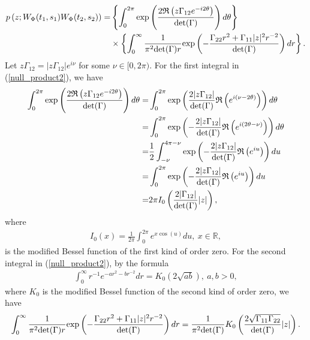 \documentclass{amsart}
\begin{document}
\begin{align}\label{null_product2}
p\left(z;W_{\Phi}(t_{1},s_{1})W_{\Phi}(t_{2},s_{2})\right)
=&
\left\{\int_{0}^{2\pi}
\textup{exp}
\left(
\frac{2\mathfrak{R}\left(z\Gamma_{12} e^{-i2\theta}
\right)}{\det(\Gamma)}\right)
d\theta\right\}
\\\notag&\times\left\{\int_{0}^{\infty}\frac{1}{\pi^{2}\textup{det}(\Gamma)r}
\textup{exp}\left(-
\frac{\Gamma_{22} r^{2}+\Gamma_{11}|z|^{2}r^{-2}}
{\det(\Gamma)}
\right)dr\right\}.
\end{align}
Let $z\Gamma_{12}= |z\Gamma_{12}|e^{i\nu}$ for some $\nu\in [0,2\pi)$.
For the first integral in (\ref{null_product2}), we have
\begin{align}\notag
\int_{0}^{2\pi}
\textup{exp}
\left(
\frac{2\mathfrak{R}\left(z\Gamma_{12}e^{-i2\theta}
\right)}{\det(\Gamma)}\right)
d\theta
=&\int_{0}^{2\pi}
\textup{exp}
\left(
\frac{2|z\Gamma_{12}|}{\det(\Gamma)}\mathfrak{R}\left(e^{i(\nu-2\theta)}
\right)\right)
d\theta
\\\notag=&
\int_{0}^{2\pi}
\textup{exp}
\left(
-\frac{2|z\Gamma_{12}|}{\det(\Gamma)}\mathfrak{R}\left(e^{i(2\theta-\nu)}
\right)\right)
d\theta
\\\notag=&\frac{1}{2}
\int_{-\nu}^{4\pi-\nu}
\textup{exp}
\left(
-\frac{2|z\Gamma_{12}|}{\det(\Gamma)}\mathfrak{R}\left(e^{iu}
\right)\right)
du
\\\notag=&\int_{0}^{2\pi}
\textup{exp}
\left(
-\frac{2|z\Gamma_{12}|}{\det(\Gamma)}\mathfrak{R}\left(e^{iu}
\right)\right)
du
\\\label{I0_app}=&2\pi I_{0}\left(\frac{2|\Gamma_{12}|}{\det(\Gamma)}|z|\right),
\end{align}
where
\begin{align*}
I_{0}(x)= \frac{1}{2\pi}\int_{0}^{2\pi}e^{x\cos(u)}du,\ x\in \mathbb{R},
\end{align*}
is the modified Bessel function of the first kind of order zero.
For the second integral in (\ref{null_product2}),
by the formula
\begin{align*}
\int_{0}^{\infty}r^{-1}e^{-ar^{2}-br^{-2}}dr=K_{0}\left(2\sqrt{ab}\right),\ a,b>0,
\end{align*}
where $K_{0}$ is the modified Bessel function of the second kind of order zero,
we have
\begin{align}\label{K0_app}
\int_{0}^{\infty}\frac{1}{\pi^{2}\textup{det}(\Gamma)r}
\textup{exp}\left(-
\frac{\Gamma_{22} r^{2}+\Gamma_{11}|z|^{2}r^{-2}}
{\det(\Gamma)}
\right)dr
=\frac{1}{\pi^{2}\textup{det}(\Gamma)}K_{0}\left(\frac{2\sqrt{\Gamma_{11}\Gamma_{22}}}{\det(\Gamma)}|z|\right).
\end{align}
\end{document}
